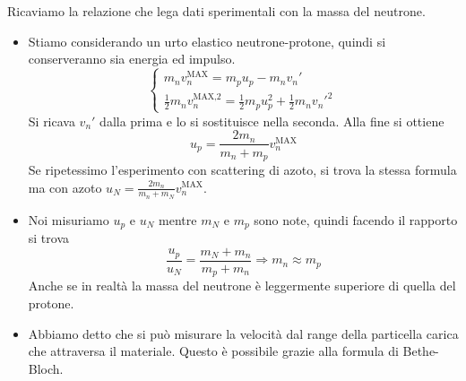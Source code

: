 Ricaviamo la relazione che lega dati sperimentali con la massa del neutrone.
\begin{itemize}
    \item Stiamo considerando un urto elastico neutrone-protone, quindi si conserveranno sia energia ed impulso.
    \begin{equation}
        \begin{cases}
          m_nv^{\text{MAX}}_n=m_pu_p-m_nv_n'\\
          \frac12 m_nv^{\text{MAX,}2}_n=\frac12 m_pu_p^2+\frac12 m_nv_n'^2
        \end{cases}\,
    \end{equation}
    Si ricava $v_n'$ dalla prima e lo si sostituisce nella seconda. Alla fine si ottiene 
    \begin{equation*}
        u_p=\frac{2m_n}{m_n+m_p}v_n^{\text{MAX}}
    \end{equation*}
    Se ripetessimo l'esperimento con scattering di azoto, si trova la stessa formula ma con azoto $u_N=\frac{2m_n}{m_n+m_N}v_n^{\text{MAX}}$. 
    \item Noi misuriamo $u_p$ e $u_N$ mentre $m_N$ e $m_p$ sono note, quindi facendo il rapporto si trova 
    \begin{equation*}
        \frac{u_p}{u_N}=\frac{m_N+m_n}{m_p+m_n}\Rightarrow m_n\approx m_p
    \end{equation*}
    Anche se in realtà la massa del neutrone è leggermente superiore di quella del protone. 
    \item Abbiamo detto che si può misurare la velocità dal range della particella carica che attraversa il materiale. Questo è possibile grazie alla formula di Bethe-Bloch. 
\end{itemize}
